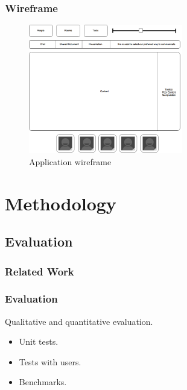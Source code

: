 \documentclass[t]{beamer}
\begin{document}
\begin{frame}[c]
		\frametitle{Wireframe}
		\begin{figure}[H]
			\includegraphics[width=0.6\textwidth]{figures/pbf.png}
			\caption{Application wireframe}
		\end{figure}
	\end{frame}

\section{Methodology}\label{meth} %
\subsection{Evaluation}
\begin{frame}[t,shrink]
\frametitle{Related Work} 
\end{frame}
\begin{frame}[c]
		\frametitle{Evaluation}
Qualitative and quantitative evaluation.

		\begin{itemize}
		\item Unit tests.
		\item Tests with users.
		\item Benchmarks.
		\end{itemize}
	\end{frame}
\end{document}
